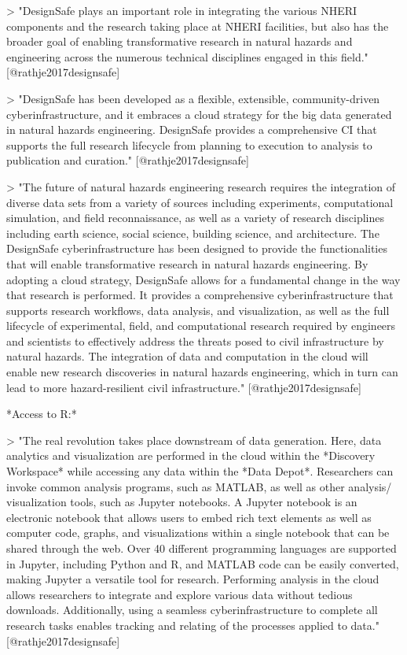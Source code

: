 > "DesignSafe plays an important role in integrating the various NHERI
components and the research taking place at NHERI facilities, but also has the
broader goal of enabling transformative research in natural hazards and
engineering across the numerous technical disciplines engaged in this field."
[@rathje2017designsafe]

> "DesignSafe has been developed as a flexible, extensible, community-driven
cyberinfrastructure, and it embraces a cloud strategy for the big data generated
in natural hazards engineering. DesignSafe provides a comprehensive CI that
supports the full research lifecycle from planning to execution to analysis to
publication and curation." [@rathje2017designsafe]


> "The future of natural hazards engineering research requires the integration
of diverse data sets from a variety of sources including experiments,
computational simulation, and field reconnaissance, as well as a variety of
research disciplines including earth science, social science, building science,
and architecture. The DesignSafe cyberinfrastructure has been designed to
provide the functionalities that will enable transformative research in natural
hazards engineering. By adopting a cloud strategy, DesignSafe allows for a
fundamental change in the way that research is performed. It provides a
comprehensive cyberinfrastructure that supports research workflows, data
analysis, and visualization, as well as the full lifecycle of experimental,
field, and computational research required by engineers and scientists to
effectively address the threats posed to civil infrastructure by natural
hazards. The integration of data and computation in the cloud will enable new
research discoveries in natural hazards engineering, which in turn can lead to
more hazard-resilient civil infrastructure." [@rathje2017designsafe]

*Access to R:*

> "The real revolution takes place downstream of data generation. Here, data 
analytics and visualization are performed in the cloud within the *Discovery
Workspace* while accessing any data within the *Data Depot*. Researchers can 
invoke common analysis programs, such as MATLAB, as well as other analysis/
visualization tools, such as Jupyter notebooks. A Jupyter notebook is an 
electronic notebook that allows users to embed rich text elements as well
as computer code, graphs, and visualizations within a single notebook that
can be shared through the web. Over 40 different programming languages are 
supported in Jupyter, including Python and R, and MATLAB code can be easily 
converted, making Jupyter a versatile tool for research. Performing analysis in 
the cloud allows researchers to integrate and explore various data without
tedious downloads. Additionally, using a seamless cyberinfrastructure to 
complete all research tasks enables tracking and relating of the processes 
applied to data." [@rathje2017designsafe]

